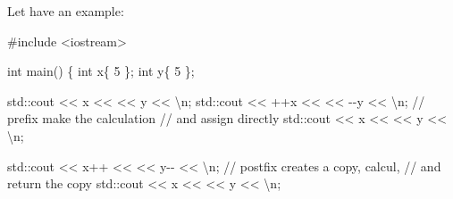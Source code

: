 \documentclass[
  letterpaper,
  DIV=11,
  numbers=noendperiod]{scrreprt}
\newenvironment{Shaded}{\begin{snugshade}}{\end{snugshade}}
\newcommand{\CommentTok}[1]{\textcolor[rgb]{0.37,0.37,0.37}{#1}}
\newcommand{\DecValTok}[1]{\textcolor[rgb]{0.68,0.00,0.00}{#1}}
\newcommand{\ErrorTok}[1]{\textcolor[rgb]{0.68,0.00,0.00}{#1}}
\newcommand{\FunctionTok}[1]{\textcolor[rgb]{0.28,0.35,0.67}{#1}}
\newcommand{\NormalTok}[1]{\textcolor[rgb]{0.00,0.23,0.31}{#1}}
\newcommand{\SpecialCharTok}[1]{\textcolor[rgb]{0.37,0.37,0.37}{#1}}
\newcommand{\StringTok}[1]{\textcolor[rgb]{0.13,0.47,0.30}{#1}}
\begin{document}
Let have an example:

\begin{Shaded}
\begin{Highlighting}[]
\CommentTok{\#include \textless{}iostream\textgreater{}}

\NormalTok{int }\FunctionTok{main}\NormalTok{()}
\NormalTok{\{}
\NormalTok{    int x\{ }\DecValTok{5}\NormalTok{ \};}
\NormalTok{    int y\{ }\DecValTok{5}\NormalTok{ \};}

\NormalTok{    std}\SpecialCharTok{::}\NormalTok{cout }\SpecialCharTok{\textless{}}\ErrorTok{\textless{}}\NormalTok{ x }\SpecialCharTok{\textless{}}\ErrorTok{\textless{}} \StringTok{\textquotesingle{} \textquotesingle{}} \SpecialCharTok{\textless{}}\ErrorTok{\textless{}}\NormalTok{ y }\SpecialCharTok{\textless{}}\ErrorTok{\textless{}} \StringTok{\textquotesingle{}}\SpecialCharTok{\textbackslash{}n}\StringTok{\textquotesingle{}}\NormalTok{;}
\NormalTok{    std}\SpecialCharTok{::}\NormalTok{cout }\SpecialCharTok{\textless{}}\ErrorTok{\textless{}} \SpecialCharTok{++}\NormalTok{x }\SpecialCharTok{\textless{}}\ErrorTok{\textless{}} \StringTok{\textquotesingle{} \textquotesingle{}} \SpecialCharTok{\textless{}}\ErrorTok{\textless{}} \SpecialCharTok{{-}{-}}\NormalTok{y }\SpecialCharTok{\textless{}}\ErrorTok{\textless{}} \StringTok{\textquotesingle{}}\SpecialCharTok{\textbackslash{}n}\StringTok{\textquotesingle{}}\NormalTok{; }\SpecialCharTok{/}\ErrorTok{/}\NormalTok{ prefix make the calculation }
                                           \SpecialCharTok{/}\ErrorTok{/}\NormalTok{  and assign directly}
\NormalTok{    std}\SpecialCharTok{::}\NormalTok{cout }\SpecialCharTok{\textless{}}\ErrorTok{\textless{}}\NormalTok{ x }\SpecialCharTok{\textless{}}\ErrorTok{\textless{}} \StringTok{\textquotesingle{} \textquotesingle{}} \SpecialCharTok{\textless{}}\ErrorTok{\textless{}}\NormalTok{ y }\SpecialCharTok{\textless{}}\ErrorTok{\textless{}} \StringTok{\textquotesingle{}}\SpecialCharTok{\textbackslash{}n}\StringTok{\textquotesingle{}}\NormalTok{;}

\NormalTok{    std}\SpecialCharTok{::}\NormalTok{cout }\SpecialCharTok{\textless{}}\ErrorTok{\textless{}}\NormalTok{ x}\SpecialCharTok{++} \ErrorTok{\textless{}\textless{}} \StringTok{\textquotesingle{} \textquotesingle{}} \SpecialCharTok{\textless{}}\ErrorTok{\textless{}}\NormalTok{ y}\SpecialCharTok{{-}{-}} \ErrorTok{\textless{}\textless{}} \StringTok{\textquotesingle{}}\SpecialCharTok{\textbackslash{}n}\StringTok{\textquotesingle{}}\NormalTok{; }\SpecialCharTok{/}\ErrorTok{/}\NormalTok{ postfix creates a copy, calcul, }
                                            \SpecialCharTok{/}\ErrorTok{/}\NormalTok{ and return the copy}
\NormalTok{    std}\SpecialCharTok{::}\NormalTok{cout }\SpecialCharTok{\textless{}}\ErrorTok{\textless{}}\NormalTok{ x }\SpecialCharTok{\textless{}}\ErrorTok{\textless{}} \StringTok{\textquotesingle{} \textquotesingle{}} \SpecialCharTok{\textless{}}\ErrorTok{\textless{}}\NormalTok{ y }\SpecialCharTok{\textless{}}\ErrorTok{\textless{}} \StringTok{\textquotesingle{}}\SpecialCharTok{\textbackslash{}n}\StringTok{\textquotesingle{}}\NormalTok{;}


\end{Highlighting}
\end{Shaded}
\end{document}
